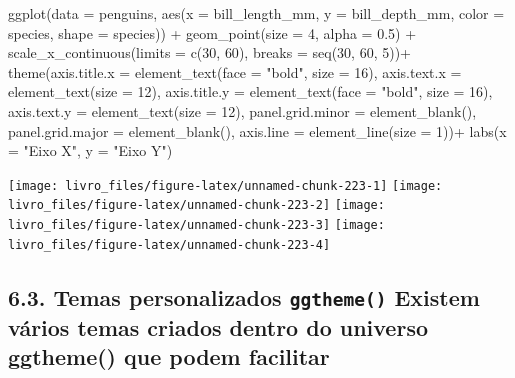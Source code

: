 \documentclass[
]{book}
\newenvironment{Shaded}{\begin{snugshade}}{\end{snugshade}}
\newcommand{\AttributeTok}[1]{\textcolor[rgb]{0.61,0.61,0.61}{#1}}
\newcommand{\DecValTok}[1]{\textcolor[rgb]{0.06,0.06,0.06}{#1}}
\newcommand{\FloatTok}[1]{\textcolor[rgb]{0.06,0.06,0.06}{#1}}
\newcommand{\FunctionTok}[1]{\textcolor[rgb]{0,0,0}{#1}}
\newcommand{\NormalTok}[1]{#1}
\newcommand{\SpecialCharTok}[1]{\textcolor[rgb]{0,0,0}{#1}}
\newcommand{\StringTok}[1]{\textcolor[rgb]{0.5,0.5,0.5}{#1}}
\begin{document}
\begin{Shaded}
\begin{Highlighting}[]
\FunctionTok{ggplot}\NormalTok{(}\AttributeTok{data =}\NormalTok{ penguins, }
       \FunctionTok{aes}\NormalTok{(}\AttributeTok{x =}\NormalTok{ bill\_length\_mm, }
           \AttributeTok{y =}\NormalTok{ bill\_depth\_mm,}
           \AttributeTok{color =}\NormalTok{ species,}
           \AttributeTok{shape =}\NormalTok{ species)) }\SpecialCharTok{+}
  \FunctionTok{geom\_point}\NormalTok{(}\AttributeTok{size =} \DecValTok{4}\NormalTok{, }\AttributeTok{alpha =} \FloatTok{0.5}\NormalTok{) }\SpecialCharTok{+}
  \FunctionTok{scale\_x\_continuous}\NormalTok{(}\AttributeTok{limits =} \FunctionTok{c}\NormalTok{(}\DecValTok{30}\NormalTok{, }\DecValTok{60}\NormalTok{), }\AttributeTok{breaks =} \FunctionTok{seq}\NormalTok{(}\DecValTok{30}\NormalTok{, }\DecValTok{60}\NormalTok{, }\DecValTok{5}\NormalTok{))}\SpecialCharTok{+}
  \FunctionTok{theme}\NormalTok{(}\AttributeTok{axis.title.x =} \FunctionTok{element\_text}\NormalTok{(}\AttributeTok{face =} \StringTok{"bold"}\NormalTok{, }\AttributeTok{size =} \DecValTok{16}\NormalTok{),}
        \AttributeTok{axis.text.x =} \FunctionTok{element\_text}\NormalTok{(}\AttributeTok{size =} \DecValTok{12}\NormalTok{),}
        \AttributeTok{axis.title.y =} \FunctionTok{element\_text}\NormalTok{(}\AttributeTok{face =} \StringTok{"bold"}\NormalTok{, }\AttributeTok{size =} \DecValTok{16}\NormalTok{),}
        \AttributeTok{axis.text.y =} \FunctionTok{element\_text}\NormalTok{(}\AttributeTok{size =} \DecValTok{12}\NormalTok{),}
        \AttributeTok{panel.grid.minor =} \FunctionTok{element\_blank}\NormalTok{(),}
        \AttributeTok{panel.grid.major =} \FunctionTok{element\_blank}\NormalTok{(),}
        \AttributeTok{axis.line =} \FunctionTok{element\_line}\NormalTok{(}\AttributeTok{size =} \DecValTok{1}\NormalTok{))}\SpecialCharTok{+}
  \FunctionTok{labs}\NormalTok{(}\AttributeTok{x =} \StringTok{"Eixo X"}\NormalTok{, }\AttributeTok{y =} \StringTok{"Eixo Y"}\NormalTok{)}
\end{Highlighting}
\end{Shaded}

\begin{center}\texttt{[image: livro\_files/figure-latex/unnamed-chunk-223-1]} \texttt{[image: livro\_files/figure-latex/unnamed-chunk-223-2]} \texttt{[image: livro\_files/figure-latex/unnamed-chunk-223-3]} \texttt{[image: livro\_files/figure-latex/unnamed-chunk-223-4]} \end{center}

\hypertarget{temas-personalizados-ggtheme-existem-vuxe1rios-temas-criados-dentro-do-universo-ggtheme-que-podem-facilitar}{%
\subsection{\texorpdfstring{6.3. Temas personalizados \texttt{ggtheme()} Existem vários temas criados dentro do universo ggtheme() que podem facilitar}{6.3. Temas personalizados ggtheme() Existem vários temas criados dentro do universo ggtheme() que podem facilitar}}\label{temas-personalizados-ggtheme-existem-vuxe1rios-temas-criados-dentro-do-universo-ggtheme-que-podem-facilitar}}
\end{document}
